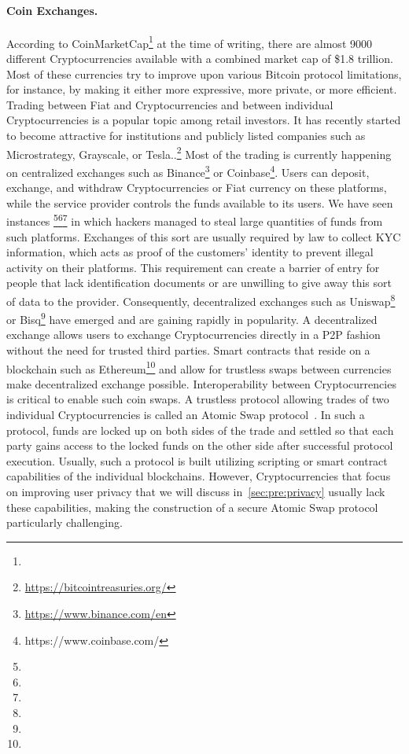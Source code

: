 \paragraph{Coin Exchanges.} According to CoinMarketCap\footnote{\urlcoinmkt} at the time of writing, there are almost 9000 different Cryptocurrencies available with a combined market cap of \$1.8 trillion.
Most of these currencies try to improve upon various Bitcoin protocol limitations, for instance, by making it either more expressive, more private, or more efficient.
Trading between Fiat and Cryptocurrencies and between individual Cryptocurrencies is a popular topic among retail investors.
It has recently started to become attractive for institutions and publicly listed companies such as Microstrategy, Grayscale, or Tesla..\footnote{\url{https://bitcointreasuries.org/}}
Most of the trading is currently happening on centralized exchanges such as Binance\footnote{\url{https://www.binance.com/en}} or Coinbase\footnote{https://www.coinbase.com/}.
Users can deposit, exchange, and withdraw Cryptocurrencies or Fiat currency on these platforms, while the service provider controls the funds available to its users.
We have seen instances \footnote{\urlmtgox}\footnote{\urlbitgrail}\footnote{\urlquadriga} in which hackers managed to steal large quantities of funds from such platforms.
Exchanges of this sort are usually required by law to collect KYC information, which acts as proof of the customers' identity to prevent illegal activity on their platforms.
This requirement can create a barrier of entry for people that lack identification documents or are unwilling to give away this sort of data to the provider.
Consequently, decentralized exchanges such as Uniswap\footnote{\urluniswp} or Bisq\footnote{\urlbisq} have emerged and are gaining rapidly in popularity.
A decentralized exchange allows users to exchange Cryptocurrencies directly in a P2P fashion without the need for trusted third parties.
Smart contracts that reside on a blockchain such as Ethereum\footnote{\urlethereum} and allow for trustless swaps between currencies make decentralized exchange possible.
Interoperability between Cryptocurrencies is critical to enable such coin swaps.
A trustless protocol allowing trades of two individual Cryptocurrencies is called an Atomic Swap protocol~\cite{herlihy2018atomic}.
In such a protocol, funds are locked up on both sides of the trade and settled so that each party gains access to the locked funds on the other side after successful protocol execution.
Usually, such a protocol is built utilizing scripting or smart contract capabilities of the individual blockchains.
However, Cryptocurrencies that focus on improving user privacy that we will discuss in~\cref{sec:pre:privacy} usually lack these capabilities, making the construction of a secure Atomic Swap protocol particularly challenging.

